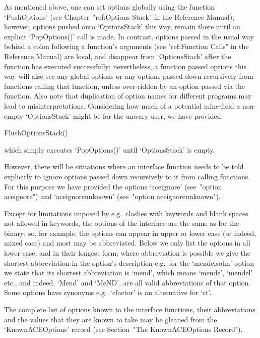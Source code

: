 As mentioned above, one can set options globally  using  the  function
`PushOptions' (see Chapter~"ref:Options Stack" in the {\GAP} Reference
Manual); however, options pushed onto `OptionsStack' this way,  remain
there until an explicit `PopOptions()'  call  is  made.  In  contrast,
options passed in the usual way behind a colon following a  function's
arguments (see "ref:Function Calls" in the  {\GAP}  Reference  Manual)
are local, and disappear from `OptionsStack' after  the  function  has
executed successfully; nevertheless, a function  passed  options  this
way will also see any  global  options  or  any  options  passed  down
recursively from functions calling that function,  unless  over-ridden
by an option passed via the function. Also note  that  duplication  of
option names for different programs may  lead  to  misinterpretations.
Considering  how  much  of  a   potential   mine-field   a   non-empty
`OptionsStack' might be for the unwary user, we have provided

\>FlushOptionsStack()

which simply executes `PopOptions()' until `OptionsStack' is empty.

However, there will be situations where an {\ACE}  interface  function
needs to be told explicitly to ignore options passed down  recursively
to it from calling functions. For this purpose we  have  provided  the
options `aceignore' (see~"option  aceignore")  and  `aceignoreunknown'
(see~"option aceignoreunknown").

\enditems


Except for limitations imposed by {\GAP}  e.g.\  clashes  with  {\GAP}
keywords and blank spaces not allowed in keywords, the options of  the
{\ACE} interface are the same as for the binary; so, for example,  the
options can appear in upper or lower case (or indeed, mixed case)  and
most may be abbreviated. Below we only list the options in  all  lower
case, and in their longest form; where  abbreviation  is  possible  we
give the shortest abbreviation in the  option's  description  e.g.~for
the `mendelsohn' option we state that  its  shortest  abbreviation  is
`mend', which means `mende', `mendel' etc.,  and  indeed,  `Mend'  and
`MeND', are all valid abbreviations of that option. Some options  have
synonyms e.g.~`cfactor' is an alternative for `ct'.

The complete list of {\ACE} options  known  to  the  {\ACE}  interface
functions, their abbreviations and the values that they are  known  to
take  may  be  gleaned  from   the   `KnownACEOptions'   record   (see
Section~"The KnownACEOptions Record").

